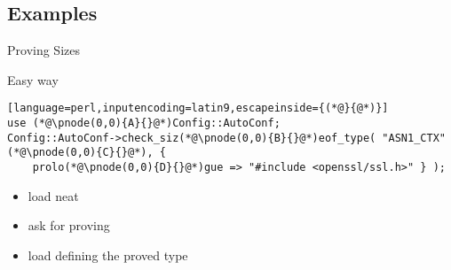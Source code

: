 \documentclass[ngerman,xcolor={table,dvipsnames},smaller,compress,hyperref={bookmarks,colorlinks}]{beamer}%
\begin{document}
\subsection{Examples}

\begin{frame}[fragile]{Proving Sizes}
\begin{block}{Easy way}
\scriptsize
\begin{lstlisting}[language=perl,inputencoding=latin9,escapeinside={(*@}{@*)}]
use (*@\pnode(0,0){A}{}@*)Config::AutoConf;
Config::AutoConf->check_siz(*@\pnode(0,0){B}{}@*)eof_type( "ASN1_CTX"(*@\pnode(0,0){C}{}@*), {
    prolo(*@\pnode(0,0){D}{}@*)gue => "#include <openssl/ssl.h>" } );
\end{lstlisting}
\end{block}

\begin{itemize}
\item<2-> load neat 

\item<3-> ask for proving  

\item<4-> load  defining the proved type
\end{itemize}

\end{frame}
\end{document}
